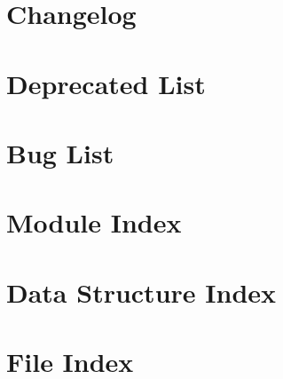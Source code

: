 \documentclass[twoside]{book}
\newcommand{\+}{\discretionary{\mbox{\scriptsize$\hookleftarrow$}}{}{}}
\begin{document}
\chapter{Changelog}
\label{changelog}

\chapter{Deprecated List}
\label{deprecated}

\chapter{Bug List}
\label{bug}

\chapter{Module Index}

\chapter{Data Structure Index}

\chapter{File Index}

\end{document}
